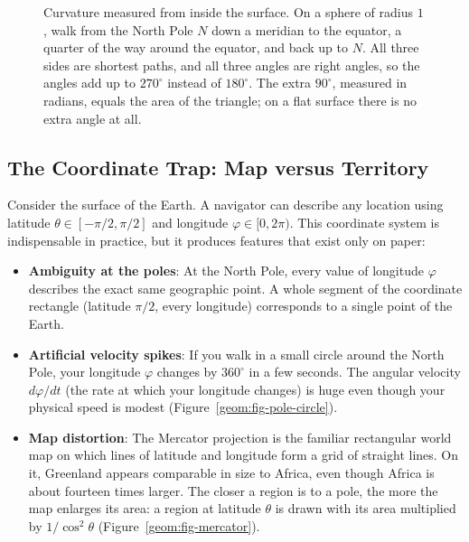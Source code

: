 \begin{figure}[htbp]
\caption{Curvature measured from inside the surface. On a sphere of radius $1$, walk from the North Pole $N$ down a meridian to the equator, a quarter of the way around the equator, and back up to $N$. All three sides are shortest paths, and all three angles are right angles, so the angles add up to $270^\circ$ instead of $180^\circ$. The extra $90^\circ$, measured in radians, equals the area of the triangle; on a flat surface there is no extra angle at all.}\label{geom:fig-sphere-triangle}
\end{figure}

\subsection{The Coordinate Trap: Map versus Territory}

Consider the surface of the Earth. A navigator can describe any location using latitude $\theta \in [-\pi/2, \pi/2]$ and longitude $\varphi \in [0, 2\pi)$. This coordinate system is indispensable in practice, but it produces features that exist only on paper:
\begin{itemize}
  \item \textbf{Ambiguity at the poles}: At the North Pole, every value of longitude $\varphi$ describes the exact same geographic point. A whole segment of the coordinate rectangle (latitude $\pi/2$, every longitude) corresponds to a single point of the Earth.
  \item \textbf{Artificial velocity spikes}: If you walk in a small circle around the North Pole, your longitude $\varphi$ changes by $360^\circ$ in a few seconds. The angular velocity $d\varphi/dt$ (the rate at which your longitude changes) is huge even though your physical speed is modest (Figure~\ref{geom:fig-pole-circle}).
  \item \textbf{Map distortion}: The Mercator projection is the familiar rectangular world map on which lines of latitude and longitude form a grid of straight lines. On it, Greenland appears comparable in size to Africa, even though Africa is about fourteen times larger. The closer a region is to a pole, the more the map enlarges its area: a region at latitude $\theta$ is drawn with its area multiplied by $1/\cos^2\theta$ (Figure~\ref{geom:fig-mercator}).
\end{itemize}

